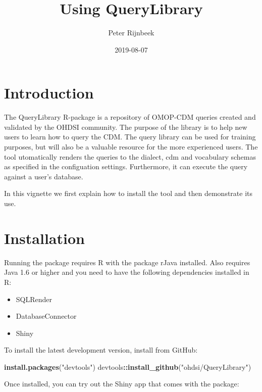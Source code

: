 \documentclass[]{article}
\title{Using QueryLibrary}
\author{Peter Rijnbeek}
\date{2019-08-07}
\newenvironment{Shaded}{\begin{snugshade}}{\end{snugshade}}
\newcommand{\KeywordTok}[1]{\textcolor[rgb]{0.13,0.29,0.53}{\textbf{#1}}}
\newcommand{\NormalTok}[1]{#1}
\newcommand{\OperatorTok}[1]{\textcolor[rgb]{0.81,0.36,0.00}{\textbf{#1}}}
\newcommand{\StringTok}[1]{\textcolor[rgb]{0.31,0.60,0.02}{#1}}
\providecommand{\tightlist}{%
  \setlength{\itemsep}{0pt}\setlength{\parskip}{0pt}}
\begin{document}
\maketitle

{
\setcounter{tocdepth}{2}
\tableofcontents
}
\hypertarget{introduction}{%
\section{Introduction}\label{introduction}}

The QueryLibrary R-package is a repository of OMOP-CDM queries created
and validated by the OHDSI community. The purpose of the library is to
help new users to learn how to query the CDM. The query library can be
used for training purposes, but will also be a valuable resource for the
more experienced users. The tool utomatically renders the queries to the
dialect, cdm and vocabulary schemas as specified in the configuation
settings. Furthermore, it can execute the query against a user's
database.

In this vignette we first explain how to install the tool and then
demonstrate its use.

\hypertarget{installation}{%
\section{Installation}\label{installation}}

Running the package requires R with the package rJava installed. Also
requires Java 1.6 or higher and you need to have the following
dependencies installed in R:

\begin{itemize}
\tightlist
\item
  SQLRender
\item
  DatabaseConnector
\item
  Shiny
\end{itemize}

To install the latest development version, install from GitHub:

\begin{Shaded}
\begin{Highlighting}[]
\KeywordTok{install.packages}\NormalTok{(}\StringTok{"devtools"}\NormalTok{)}
\NormalTok{devtools}\OperatorTok{::}\KeywordTok{install_github}\NormalTok{(}\StringTok{"ohdsi/QueryLibrary"}\NormalTok{)}
\end{Highlighting}
\end{Shaded}

Once installed, you can try out the Shiny app that comes with the
package:
\end{document}
